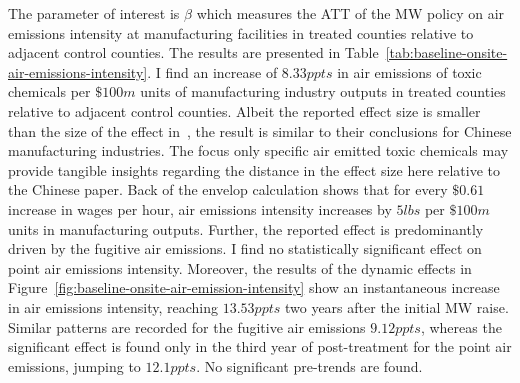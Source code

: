 \documentclass[12pt, english]{article}
\begin{document}
    The parameter of interest is $\beta$ which measures the ATT of the MW policy on air emissions intensity at manufacturing facilities in treated counties relative to adjacent control counties. The results are presented in Table~\ref{tab:baseline-onsite-air-emissions-intensity}. I find an increase of $8.33ppts$ in air emissions of toxic chemicals per $\$100m$ units of manufacturing industry outputs in treated counties relative to adjacent control counties. Albeit the reported effect size is smaller than the size of the effect in~\cite{zhang2023unintended}, the result is similar to their conclusions for Chinese manufacturing industries. The focus only specific air emitted toxic chemicals may provide tangible insights regarding the distance in the effect size here relative to the Chinese paper. Back of the envelop calculation shows that for every $\$0.61$ increase in wages per hour, air emissions intensity increases by $5lbs$ per $\$100m$ units in manufacturing outputs. Further, the reported effect is predominantly driven by the fugitive air emissions. I find no statistically significant effect on point air emissions intensity. Moreover, the results of the dynamic effects in Figure~\ref{fig:baseline-onsite-air-emission-intensity} show an instantaneous increase in air emissions intensity, reaching $13.53ppts$ two years after the initial MW raise. Similar patterns are recorded for the fugitive air emissions $9.12ppts$, whereas the significant effect is found only in the third year of post-treatment for the point air emissions, jumping to $12.1ppts$. No significant pre-trends are found.
    
\end{document}
